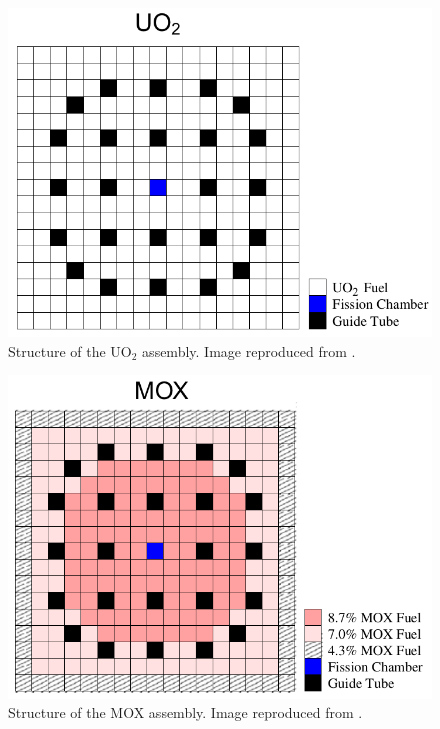 \documentclass{anstrans}
\begin{document}
\begin{figure}[htbp!] %
    \centering
    \includegraphics[width=0.95\linewidth]{figures/bench-config2.png}
    \hfill
    \caption{Structure of the UO$_2$ assembly. Image reproduced from \cite{capilla_applications_2009}.}
    \label{fig:bench2}
\end{figure}

\begin{figure}[htbp!] %
    \centering
    \includegraphics[width=0.95\linewidth]{figures/bench-config3.png}
    \hfill
    \caption{Structure of the MOX assembly. Image reproduced from \cite{capilla_applications_2009}.}
    \label{fig:bench3}
\end{figure}
\end{document}
